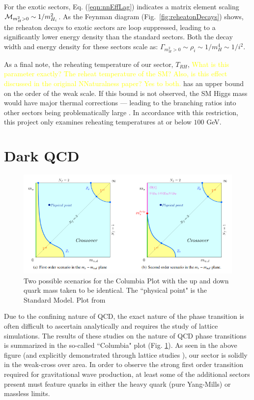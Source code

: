 \documentclass[nofootinbib,twocolumn,preprintnumbers]{revtex4-1}
\begin{document}
For the exotic sectors, Eq. (\ref{eqn:nnEffLag}) indicates a matrix element scaling ${\cal M}_{m_H^2>0} \sim 1/m_{H_i}^2$. As the Feynman diagram (Fig.~\ref{fig:reheatonDecays}) shows, the reheaton decays to exotic sectors are loop suppressed, leading to a significantly lower energy density than the standard sectors. Both the decay width and energy density for these sectors scale as: $\Gamma_{m_H^2>0} \sim \rho_i \sim 1/m_H^4 \sim 1/i^2$. 

As a final note, the reheating temperature of our sector, $T_{RH}$, \textcolor{yellow}{What is this parameter exactly? The reheat temperature of the SM? Also, is this effect discussed in the original NNaturalness paper? Yes to both.} has an upper bound on the order of the weak scale. If this bound is not observed, the SM Higgs mass would have major thermal corrections --- leading to the branching ratios into other sectors being problematically large \citep{Arkani-Hamed:2016rle}. In accordance with this restriction, this project only examines reheating temperatures at or below $100$ GeV.


\section{Dark QCD}
\label{sec:dQCD}

\begin{figure}[tb]
\centering
\begin{minipage}[c]{\textwidth}
\includegraphics[width=1.0\textwidth]{columbia.png}
\end{minipage}
\hfill
\caption{Two possible scenarios for the Columbia Plot with the up and down quark mass taken to be identical. The ``physical point" is the Standard Model. Plot from \cite{Cuteri:2017zcb}
}
\label{fig:columbia}
\end{figure}

Due to the confining nature of QCD, the exact nature of the phase transition is often difficult to ascertain analytically and requires the study of lattice simulations. The results of these studies on the nature of QCD phase transitions is summarized in the so-called ``Columbia" plot (Fig. \ref{fig:columbia}). As seen in the above figure (and explicitly demonstrated through lattice studies \cite{lattice}), our sector is solidly in the weak-cross over area. In order to observe the strong first order transition required for gravitational wave production, at least some of the additional sectors present must feature quarks in either the heavy quark (pure Yang-Mills) or massless limits.    
\end{document}
